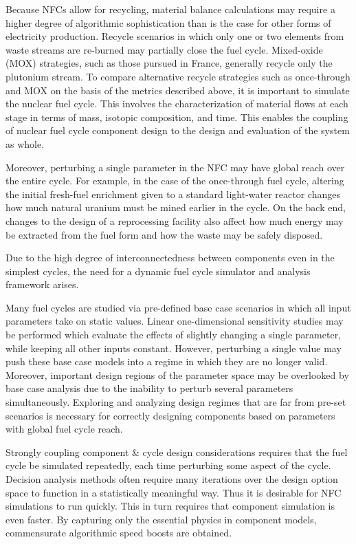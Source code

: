 Because NFCs allow for recycling, material balance calculations may require a higher degree of
algorithmic sophistication than is the case for other forms of electricity production.  
Recycle scenarios in which only one or two 
elements from waste streams are re-burned may partially close the fuel cycle.  
Mixed-oxide (MOX) strategies, such as those pursued in France, 
generally recycle only the plutonium stream.  
To compare alternative recycle strategies such as once-through and MOX on the basis of the metrics 
described above, it is important to simulate the nuclear fuel cycle.  
This involves the characterization 
of material flows at each stage in terms of mass, isotopic composition, and time.  This enables 
the coupling of nuclear fuel cycle component design to the design and evaluation of the system as whole.  

Moreover, perturbing a single parameter in the NFC may have global reach over the entire cycle.
For example, in the case of the once-through fuel cycle, altering the initial fresh-fuel 
 enrichment given to a standard light-water reactor changes how much natural 
uranium must be mined earlier in the cycle.  On the back end, changes to the design of 
a reprocessing facility also affect 
how much energy may be extracted from the fuel form and how the waste may be safely disposed.

Due to the high degree of interconnectedness between components 
even in the simplest cycles, the need for a dynamic 
fuel cycle simulator and analysis framework arises.  

Many fuel cycles are studied via pre-defined base case scenarios in which all input parameters
take on static values.  Linear one-dimensional sensitivity studies may be performed which evaluate
the effects of slightly changing a single parameter, while keeping all other inputs
constant.  However, perturbing a single value may push these base case models into a regime in which 
they are no longer valid.  Moreover, important design regions of the parameter space may be 
overlooked by base case analysis due to the inability to perturb several parameters
simultaneously.  
Exploring and analyzing design regimes that are far from pre-set scenarios is necessary for 
correctly designing components based on parameters with global fuel cycle reach.

Strongly coupling component \& cycle design considerations requires that the fuel cycle be 
simulated repeatedly, each time perturbing some aspect of the cycle.  
Decision analysis methods often require many iterations over the design option space
to function in a statistically meaningful way.
Thus it is desirable for
NFC simulations to run quickly.  This in turn requires that component simulation is even faster. 
By capturing only the essential physics in component models, commensurate algorithmic speed 
boosts are obtained.

